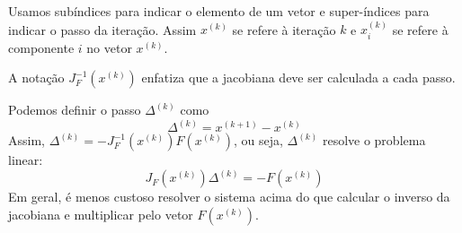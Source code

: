 \begin{obs} Usamos subíndices para indicar o elemento de um vetor e super-índices para indicar o passo da iteração. Assim $x^{(k)}$ se refere à iteração $k$ e $x_i^{(k)}$ se refere à componente $i$ no vetor $x^{(k)}$.
\end{obs}
\begin{obs} A notação $J_F^{-1}\left(x^{(k)}\right)$ enfatiza que a jacobiana deve ser calculada a cada passo.
\end{obs}
\begin{obs} Podemos definir o passo $\Delta^{(k)}$ como
$$\Delta^{(k)}= x^{(k+1)}-x^{(k)}$$
Assim, $\Delta^{(k)}=-J_F^{-1}\left(x^{(k)}\right)F(x^{(k)})$, ou seja, $\Delta^{(k)}$ resolve o problema linear:
$$J_F\left(x^{(k)}\right)\Delta^{(k)}= - F(x^{(k)})$$
Em geral, é menos custoso resolver o sistema acima do que calcular o inverso da jacobiana e multiplicar pelo vetor $F(x^{(k)})$.
\end{obs}

